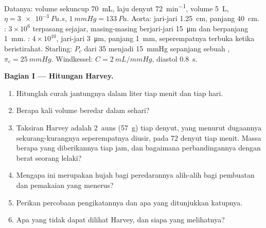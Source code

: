 \begin{problem}
\label{pb:b2:blood-circulation:1}
Datanya: volume sekuncup \qty{70}{mL}, laju denyut \qty{72}{min^{-1}},
volume  \qty{5}{L}, $\eta = \qty{3e-3}{Pa.s}$, $\qty{1}{mmHg} =
\qty{133}{Pa}$. Aorta: jari-jari \qty{1.25}{cm}, panjang \qty{40}{cm}.
: $3\times 10^{6}$ terpasang sejajar, masing-masing berjari-jari
\qty{15}{\micro m} dan berpanjang \qty{1}{mm}. : $4\times
10^{10}$, jari-jari \qty{3}{\micro m}, panjang \qty{1}{mm}, seperempatnya
terbuka ketika beristirahat. Starling: $P_c$ dari 35 menjadi \qty{15}{mmHg}
sepanjang sebuah , $\pi_c = \qty{25}{mmHg}$. Windkessel: $C =
\qty{2}{mL/mmHg}$, diastol \qty{0.8}{s}.

\medskip
\noindent\textbf{Bagian I --- Hitungan Harvey.}
\begin{enumerate}
  \item Hitunglah curah jantungnya dalam liter tiap menit dan tiap hari.
  \item Berapa kali volume  beredar dalam sehari?
  \item Taksiran Harvey adalah 2~auns (\qty{57}{g}) tiap denyut, yang
        menurut dugaannya sekurang-kurangnya seperempatnya diusir, pada
        72 denyut tiap menit. Massa  berapa yang diberikannya tiap
        jam, dan bagaimana perbandingannya dengan berat seorang lelaki?
  \item Mengapa ini merupakan hujah bagi peredarannya alih-alih bagi
        pembuatan dan pemakaian yang menerus?
  \item Perikan percobaan pengikatannya dan apa yang ditunjukkan katupnya.
  \item Apa yang tidak dapat dilihat Harvey, dan siapa yang melihatnya?
\end{enumerate}


\end{problem}
